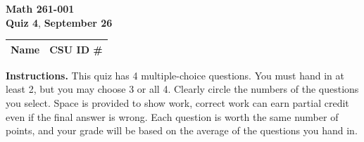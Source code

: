 \documentclass[12pt]{exam}
\newcommand{\class}{Math 261-001} %
\newcommand{\examnum}{Quiz 4} %
\newcommand{\examdate}{September 26} %
\begin{document}
\pagestyle{plain}
\thispagestyle{empty}

\noindent
\textbf{\class}\\
\textbf{\examnum}, \textbf{\examdate} \\



\setlength{\tabcolsep}{3.5cm} %
\renewcommand{\arraystretch}{1.5}
\setlength\extrarowheight{1cm}
\begin{tabular}{ |c|c| } 
 \hline
 Name   & CSU ID \#  \\ 
 \hline
\end{tabular}
\vspace{10pt}

\textbf{Instructions.}  
This quiz has 4 multiple-choice questions. You must hand in at least 2, but you may choose 3 or all 4. Clearly circle the numbers of the questions you select. Space is provided to show work, correct work can earn partial credit even if the final answer is wrong. Each question is worth the same number of points, and your grade will be based on the average of the questions you hand in.

\end{document}
